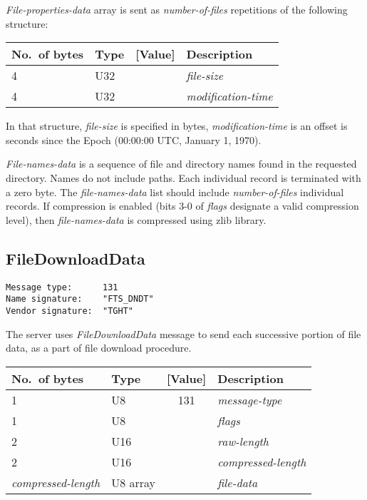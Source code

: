 \documentclass[a4paper]{article}
\newcommand{\typestr}[1]{\textit{#1}}
\begin{document}
\typestr{File-properties-data} array is sent as
\typestr{number-of-files} repetitions of the following structure:

\begin{tabular}{l|lc|l} \hline
No.\ of bytes & Type & [Value] & Description \\ \hline
4 & U32 &  & \typestr{file-size} \\
4 & U32 &  & \typestr{modification-time} \\
\hline\end{tabular}

In that structure, \typestr{file-size} is specified in bytes,
\typestr{modification-time} is an offset is seconds since the Epoch
(00:00:00 UTC, January 1, 1970).

\typestr{File-names-data} is a sequence of file and directory names
found in the requested directory. Names do not include paths.
Each individual record is terminated with a zero byte. The
\typestr{file-names-data} list should include
\typestr{number-of-files} individual records. If compression is
enabled (bits 3-0 of \typestr{flags} designate a valid compression
level), then \typestr{file-names-data} is compressed using zlib
library.


\newpage
\subsection{FileDownloadData}
\begin{verbatim}
Message type:      131
Name signature:    "FTS_DNDT"
Vendor signature:  "TGHT"
\end{verbatim}

The server uses \typestr{FileDownloadData} message to send each
successive portion of file data, as a part of file download procedure.

\begin{tabular}{l|lc|l} \hline
No.\ of bytes & Type & [Value] & Description \\ \hline
1 & U8  & 131 & \typestr{message-type} \\
1 & U8  &     & \typestr{flags} \\
2 & U16 &     & \typestr{raw-length} \\
2 & U16 &     & \typestr{compressed-length} \\
\typestr{compressed-length} & U8 array & & \typestr{file-data} \\
\hline\end{tabular}
\end{document}
